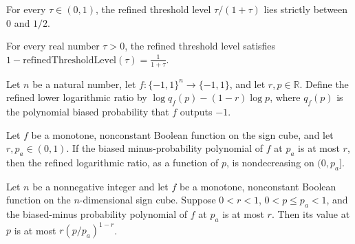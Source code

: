 \begin{theorem}
\label{FABL.refinedThresholdLevel_mem_Ioo}
\leanok
{}
For every $\tau\in(0,1)$, the refined threshold level $\tau/(1+\tau)$ lies strictly
between $0$ and $1/2$.
\end{theorem}

\begin{theorem}
\label{FABL.one_sub_refinedThresholdLevel}
\leanok
{}
For every real number $\tau>0$, the refined threshold level satisfies
$1-\mathrm{refinedThresholdLevel}(\tau)=\frac{1}{1+\tau}$.
\end{theorem}

\begin{definition}
\label{FABL.refinedLowerLogRatio}
\leanok
{}
Let $n$ be a natural number, let $f:\{-1,1\}^n\to\{-1,1\}$, and let $r,p\in\mathbb R$.
Define the refined lower logarithmic ratio by $\log q_f(p)-(1-r)\log p$, where $q_f(p)$
is the polynomial biased probability that $f$ outputs $-1$.
\end{definition}

\begin{theorem}
\label{FABL.refinedLowerLogRatio_monotoneOn}
\leanok
{}
Let $f$ be a monotone, nonconstant Boolean function on the sign cube, and let
$r,p_a\in(0,1)$. If the biased minus-probability polynomial of $f$ at $p_a$ is at most
$r$, then the refined logarithmic ratio, as a function of $p$, is nondecreasing on
$(0,p_a]$.
\end{theorem}

\begin{theorem}
\label{FABL.biasedMinusProbabilityPolynomial_le_refined_rpow}
\leanok
{}
Let $n$ be a nonnegative integer and let $f$ be a monotone, nonconstant Boolean function
on the $n$-dimensional sign cube. Suppose $0<r<1$, $0<p\le p_a<1$, and the biased-minus
probability polynomial of $f$ at $p_a$ is at most $r$. Then its value at $p$ is at most
$r(p/p_a)^{1-r}$.
\end{theorem}

